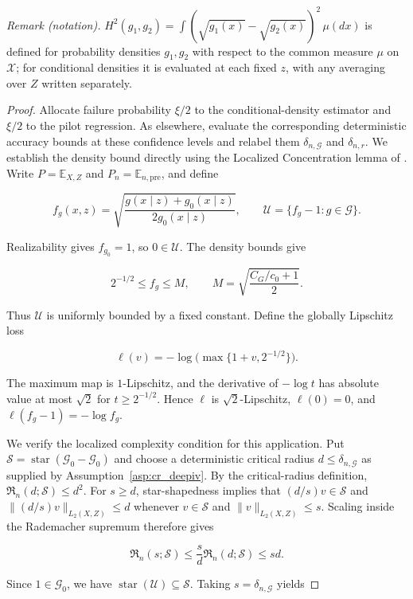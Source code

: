 \noindent\textit{Remark (notation).} $H^2(g_1,g_2)=\int(\sqrt{g_1(x)}-\sqrt{g_2(x)})^2\,\mu(dx)$ is defined for probability densities $g_1,g_2$ with respect to the common measure $\mu$ on $\mathcal X$; for conditional densities it is evaluated at each fixed $z$, with any averaging over $Z$ written separately.

\begin{proof}
Allocate failure probability $\xi/2$ to the conditional-density estimator and
$\xi/2$ to the pilot regression. As elsewhere, evaluate the corresponding
deterministic accuracy bounds at these confidence levels and relabel them
$\delta_{n,\mathcal G}$ and $\delta_{n,r}$.
We establish the density bound directly using the Localized Concentration lemma of \citet{li2024regularized}. Write $P=\mathbb E_{X,Z}$ and $P_n=\mathbb E_{n,\mathrm{pre}}$, and define

\[
f_g(x,z)=\sqrt{\frac{g(x\mid z)+g_0(x\mid z)}{2g_0(x\mid z)}},\qquad
\mathcal U=\{f_g-1:g\in\mathcal G\}.
\]

Realizability gives $f_{g_0}=1$, so $0\in\mathcal U$. The density bounds give

\[
2^{-1/2}\leqslant f_g\leqslant M,\qquad
M=\sqrt{\frac{C_G/c_0+1}{2}}.
\]

Thus $\mathcal U$ is uniformly bounded by a fixed constant. Define the globally Lipschitz loss

\[
\ell(v)=-\log\bigl(\max\{1+v,2^{-1/2}\}\bigr).
\]

The maximum map is $1$-Lipschitz, and the derivative of $-\log t$ has absolute value at most $\sqrt2$ for $t\geqslant2^{-1/2}$. Hence $\ell$ is $\sqrt2$-Lipschitz, $\ell(0)=0$, and $\ell(f_g-1)=-\log f_g$. 

We verify the localized complexity condition for this application. Put $\mathcal S=\operatorname{star}(\mathcal G_0-\mathcal G_0)$ and choose a deterministic critical radius $d\leqslant\delta_{n,\mathcal G}$ as supplied by Assumption~\ref{asp:cr_deepiv}. By the critical-radius definition, $\mathfrak R_n(d;\mathcal S)\leqslant d^2$. For $s\geqslant d$, star-shapedness implies that $(d/s)v\in\mathcal S$ and $\|(d/s)v\|_{L_2(X,Z)}\leqslant d$ whenever $v\in\mathcal S$ and $\|v\|_{L_2(X,Z)}\leqslant s$. Scaling inside the Rademacher supremum therefore gives

\[
\mathfrak R_n(s;\mathcal S)
\leqslant\frac{s}{d}\mathfrak R_n(d;\mathcal S)
\leqslant sd.
\]

Since $1\in\mathcal G_0$, we have $\operatorname{star}(\mathcal U)\subseteq\mathcal S$. Taking $s=\delta_{n,\mathcal G}$ yields


\end{proof}

